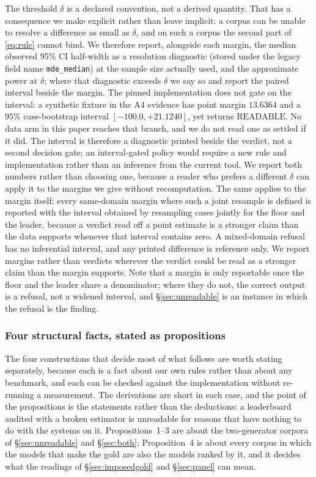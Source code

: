 \documentclass{article}
\newcommand{\ids}[1]{\texttt{\small #1}} %
\begin{document}
The threshold $\delta$ is a declared convention, not a derived quantity. That has a consequence we make explicit rather than leave implicit: a corpus can be unable to resolve a difference as small as $\delta$, and on such a corpus the second part of \eqref{eq:rule} cannot bind. We therefore report, alongside each margin, the median observed 95\% CI half-width as a resolution diagnostic (stored under the legacy field name \ids{mde\_median}) at the sample size actually used, and the approximate power at $\delta$; where that diagnostic exceeds $\delta$ we say so and report the paired interval beside the margin. The pinned implementation does not gate on the interval: a synthetic fixture in the A4 evidence has point margin $13.6364$ and a $95\%$ case-bootstrap interval $[-100.0,+21.1240]$, yet returns $\mathrm{READABLE}$. No data arm in this paper reaches that branch, and we do not read one as settled if it did. The interval is therefore a diagnostic printed beside the verdict, not a second decision gate; an interval-gated policy would require a new rule and implementation rather than an inference from the current tool. We report both numbers rather than choosing one, because a reader who prefers a different $\delta$ can apply it to the margins we give without recomputation. The same applies to the margin itself: every same-domain margin where such a joint resample is defined is reported with the interval obtained by resampling cases jointly for the floor and the leader, because a verdict read off a point estimate is a stronger claim than the data supports whenever that interval contains zero. A mixed-domain refusal has no inferential interval, and any printed difference is reference only. We report margins rather than verdicts wherever the verdict could be read as a stronger claim than the margin supports. Note that a margin is only reportable once the floor and the leader share a denominator; where they do not, the correct output is a refusal, not a widened interval, and \S\ref{sec:unreadable} is an instance in which the refusal is the finding.

\subsubsection{Four structural facts, stated as propositions}
\label{sec:props} The four constructions that decide most of what follows are worth stating separately, because each is a fact about our own rules rather than about any benchmark, and each can be checked against the implementation without re-running a measurement. The derivations are short in each case, and the point of the propositions is the statements rather than the deductions: a leaderboard audited with a broken estimator is unreadable for reasons that have nothing to do with the systems on it. Propositions~1--3 are about the two-generator corpora of \S\ref{sec:unreadable} and \S\ref{sec:both}; Proposition~4 is about every corpus in which the models that make the gold are also the models ranked by it, and it decides what the readings of \S\ref{sec:imposedgold} and \S\ref{sec:panel} can mean.
\end{document}
